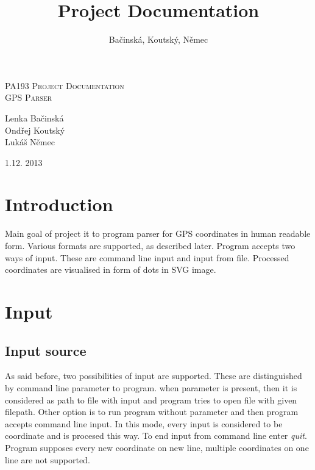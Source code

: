 \documentclass[12pt,titlepage]{article}
\title{Project Documentation}
\author{Bačinská, Koutský, Němec}
\begin{document}
\begin{titlepage}
\begin{center}
\textsc{\LARGE PA193 Project Documentation}\\[0.6cm]
\textsc{\Large GPS Parser}\\[1cm]


\begin{multicols}{3}
\Large{Lenka Bačinská}\\[1cm]


\columnbreak
\Large{Ondřej Koutský}\\[1cm]

\columnbreak
\Large{Lukáš Němec}\\[1cm]
\end{multicols}
\bigskip
\bigskip

\Large{1.12. 2013}
\end{center}
\end{titlepage}



\tableofcontents
\newpage

\section{Introduction}
Main goal of project it to program parser for GPS coordinates in human readable form.
Various formats are supported, as described later. Program accepts two ways of input. These are
command line input and input from file. Processed coordinates are visualised in form of dots in 
SVG image. 

\section{Input}
\subsection{Input source}
As said before, two possibilities of input are supported. These are distinguished by command line 
parameter to program. when parameter is present, then it is considered as path to file with input 
and program tries to open file with given filepath. Other option is to run program without parameter
and then program accepts command line input. In this mode, every input is considered to be coordinate
and is procesed this way. To end input from command line enter \textit{quit}. 
Program supposes every new coordinate on new line, multiple coordinates on one line are not 
supported.
\end{document}
